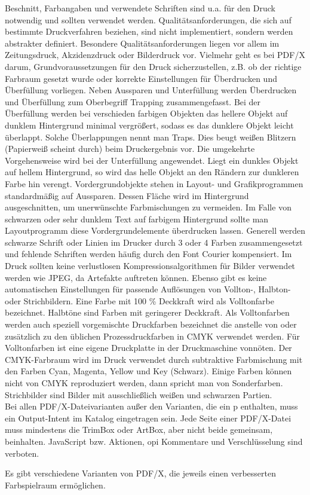 Beschnitt, Farbangaben und verwendete Schriften sind u.a. für den Druck notwendig und sollten verwendet werden. Qualitätsanforderungen, die sich auf bestimmte Druckverfahren beziehen, sind nicht implementiert, sondern werden abstrakter definiert. Besondere Qualitätsanforderungen liegen vor allem im Zeitungsdruck, Akzidenzdruck oder Bilderdruck vor. Vielmehr geht es bei PDF/X darum, Grundvoraussetzungen für den Druck sicherzustellen, z.B. ob der richtige Farbraum gesetzt wurde oder korrekte Einstellungen für Überdrucken und Überfüllung vorliegen. Neben Aussparen und Unterfüllung werden Überdrucken und Überfüllung zum Oberbegriff Trapping zusammengefasst. Bei der Überfüllung werden bei verschieden farbigen Objekten das hellere Objekt auf dunklem Hintergrund minimal vergrößert, sodass es das dunklere Objekt leicht überlappt. Solche Überlappungen nennt man Traps. Dies beugt weißen Blitzern (Papierweiß scheint durch) beim Druckergebnis vor. Die umgekehrte Vorgehensweise wird bei der Unterfüllung angewendet. Liegt ein dunkles Objekt auf hellem Hintergrund, so wird das helle Objekt an den Rändern zur dunkleren Farbe hin verengt. Vordergrundobjekte stehen in Layout- und Grafikprogrammen standardmäßig auf Aussparen. Dessen Fläche wird im Hintergrund ausgeschnitten, um unerwünschte Farbmischungen zu vermeiden. Im Falle von schwarzen oder sehr dunklem Text auf farbigem Hintergrund sollte man Layoutprogramm diese Vordergrundelemente überdrucken lassen. \cite{kompendium} Generell werden schwarze Schrift oder Linien im Drucker durch 3 oder 4 Farben zusammengesetzt und fehlende Schriften werden häufig durch den Font Courier kompensiert. Im Druck sollten keine verlustlosen Kompressionsalgorithmen für Bilder verwendet werden wie JPEG, da Artefakte auftreten können. Ebenso gibt es keine automatischen Einstellungen für passende Auflösungen von Vollton-, Halbton- oder Strichbildern. \cite{adobe-pdf-x} Eine Farbe mit 100 \% Deckkraft wird als Volltonfarbe bezeichnet. Halbtöne sind Farben mit geringerer Deckkraft. \cite{halb-voll} Als Volltonfarben werden auch speziell vorgemischte Druckfarben bezeichnet die anstelle von oder zusätzlich zu den üblichen Prozessdruckfarben in CMYK verwendet werden. Für Volltonfarben ist eine eigene Druckplatte in der Druckmaschine vonnöten. \cite{adobe-voll} Der CMYK-Farbraum wird im Druck verwendet durch subtraktive Farbmischung mit den Farben Cyan, Magenta, Yellow und Key (Schwarz). Einige Farben können nicht von CMYK reproduziert werden, dann spricht man von Sonderfarben. Strichbilder sind Bilder mit ausschließlich weißen und schwarzen Partien. \cite{strich} \\
Bei allen PDF/X-Dateivarianten außer den Varianten, die ein p enthalten, muss ein Output-Intent im Katalog eingetragen sein. Jede Seite einer PDF/X-Datei muss mindestens die TrimBox oder ArtBox, aber nicht beide gemeinsam, beinhalten. JavaScript bzw. Aktionen, \gls{opi} Kommentare und Verschlüsselung sind verboten. \cite{schneeberger}
\par
Es gibt verschiedene Varianten von PDF/X, die jeweils einen verbesserten Farbspielraum ermöglichen. 

